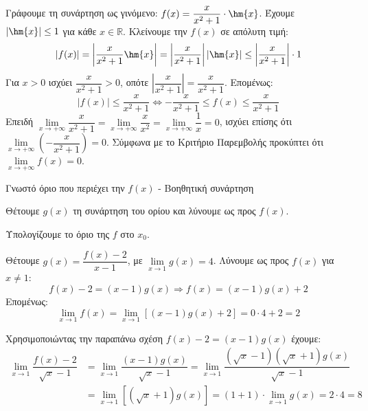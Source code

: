 
\lysh
Γράφουμε τη συνάρτηση ως γινόμενο: $\displaystyle f(x) = \dfrac{x}{x^2+1}\cdot\hm{x}$.
Έχουμε $|\hm{x}| \le 1$ για κάθε $x\in\mathbb{R}$. Κλείνουμε την $f(x)$ σε απόλυτη τιμή:
\[ |f(x)| = \left| \dfrac{x}{x^2+1}\hm{x} \right| = \left| \dfrac{x}{x^2+1} \right| |\hm{x}| \le \left| \dfrac{x}{x^2+1} \right| \cdot 1 \]
Για $x>0$ ισχύει $\dfrac{x}{x^2+1} > 0$, οπότε $\left| \dfrac{x}{x^2+1} \right| = \dfrac{x}{x^2+1}$. Επομένως:
\[ |f(x)| \le \dfrac{x}{x^2+1} \Leftrightarrow -\dfrac{x}{x^2+1} \le f(x) \le \dfrac{x}{x^2+1} \]
Επειδή $\displaystyle \lim\limits_{x\to +\infty} \dfrac{x}{x^2+1} = \lim\limits_{x\to +\infty} \dfrac{x}{x^2} = \lim\limits_{x\to +\infty} \dfrac{1}{x} = 0$, ισχύει επίσης ότι $\displaystyle \lim\limits_{x\to +\infty} \left(-\dfrac{x}{x^2+1}\right) = 0$.
Σύμφωνα με το Κριτήριο Παρεμβολής προκύπτει ότι $\displaystyle \lim\limits_{x\to +\infty} f(x) = 0$.
\begin{askhsh}{Γνωστό όριο που περιέχει την $ f(x) $ - Βοηθητική συνάρτηση}
\bhmata\begin{bhma}
\item Θέτουμε $ g(x) $ τη συνάρτηση του ορίου και λύνουμε ως προς $ f(x) $.
\item Υπολογίζουμε το όριο της $ f $ στο $ x_0 $.
\end{bhma}
\end{askhsh}
\lysh\vspace{-7mm}
\begin{alist}
\item Θέτουμε $\displaystyle g(x) = \dfrac{f(x)-2}{x-1}$, με $\lim\limits_{x\to 1} g(x) = 4$. Λύνουμε ως προς $f(x)$ για $x \neq 1$:
\[ f(x) - 2 = (x-1)g(x) \Rightarrow f(x) = (x-1)g(x) + 2 \]
Επομένως:
\[ \lim\limits_{x\to 1} f(x) = \lim\limits_{x\to 1} \left[ (x-1)g(x) + 2 \right] = 0 \cdot 4 + 2 = 2 \]
\item Χρησιμοποιώντας την παραπάνω σχέση $f(x)-2 = (x-1)g(x)$ έχουμε:
\begin{align*}
\lim\limits_{x\to 1} \dfrac{f(x)-2}{\sqrt{x}-1} &= \lim\limits_{x\to 1} \dfrac{(x-1)g(x)}{\sqrt{x}-1} = \lim\limits_{x\to 1} \dfrac{(\sqrt{x}-1)(\sqrt{x}+1)g(x)}{\sqrt{x}-1} \\
&= \lim\limits_{x\to 1} \left[ (\sqrt{x}+1)g(x) \right] = (1+1) \cdot \lim\limits_{x\to 1} g(x) = 2 \cdot 4 = 8
\end{align*}
\end{alist}
